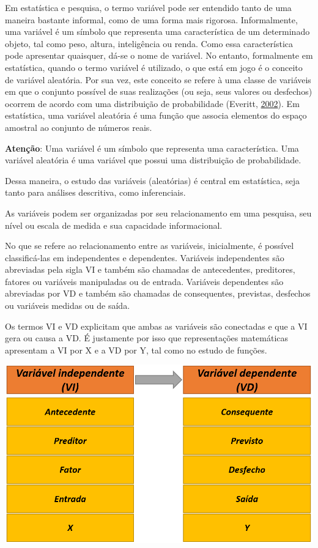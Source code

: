 \documentclass[
]{book}
\begin{document}
Em estatística e pesquisa, o termo variável pode ser entendido tanto de
uma maneira bastante informal, como de uma forma mais rigorosa.
Informalmente, uma variável é um símbolo que representa uma
característica de um determinado objeto, tal como peso, altura,
inteligência ou renda. Como essa característica pode apresentar
quaisquer, dá-se o nome de variável. No entanto, formalmente em
estatística, quando o termo variável é utilizado, o que está em jogo é o
conceito de variável aleatória. Por sua vez, este conceito se refere à
uma classe de variáveis em que o conjunto possível de suas realizações
(ou seja, seus valores ou desfechos) ocorrem de acordo com uma
distribuição de probabilidade (Everitt,
\protect\hyperlink{ref-everitt2002cambridge}{2002}). Em estatística, uma
variável aleatória é uma função que associa elementos do espaço amostral
ao conjunto de números reais.

\begin{warning}

\textbf{Atenção}: Uma variável é um símbolo que representa uma
característica. Uma variável aleatória é uma variável que possui uma
distribuição de probabilidade.

\end{warning}

Dessa maneira, o estudo das variáveis (aleatórias) é central em
estatística, seja tanto para análises descritiva, como inferenciais.

As variáveis podem ser organizadas por seu relacionamento em uma
pesquisa, seu nível ou escala de medida e sua capacidade informacional.

No que se refere ao relacionamento entre as variáveis, inicialmente, é
possível classificá-las em independentes e dependentes. Variáveis
independentes são abreviadas pela sigla VI e também são chamadas de
antecedentes, preditores, fatores ou variáveis manipuladas ou de
entrada. Variáveis dependentes são abreviadas por VD e também são
chamadas de consequentes, previstas, desfechos ou variáveis medidas ou
de saída.

Os termos VI e VD explicitam que ambas as variáveis são conectadas e que
a VI gera ou causa a VD. É justamente por isso que representações
matemáticas apresentam a VI por X e a VD por Y, tal como no estudo de
funções.

\includegraphics{./img/cap_vi_vd1.png}
\end{document}

